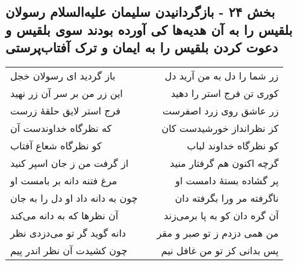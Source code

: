 \begin{center}
\section*{بخش ۲۴ - بازگردانیدن سلیمان علیه‌السلام رسولان بلقیس را به آن هدیه‌ها کی آورده بودند سوی بلقیس و دعوت  کردن بلقیس را به ایمان  و ترک آفتاب‌پرستی}
\label{sec:sh024}
\begin{longtable}{l p{0.5cm} r}
باز گردید ای رسولان خجل
&&
زر شما را دل به من آرید دل
\\
این زر من بر سر آن زر نهید
&&
کوری تن فرج استر را دهید
\\
فرج استر لایق حلقهٔ زرست
&&
زر عاشق روی زرد اصفرست
\\
که نظرگاه خداوندست آن
&&
کز نظرانداز خورشیدست کان
\\
کو نظرگاه شعاع آفتاب
&&
کو نظرگاه خداوند لباب
\\
از گرفت من ز جان اسپر کنید
&&
گرچه اکنون هم گرفتار منید
\\
مرغ فتنه دانه بر بامست او
&&
پر گشاده بستهٔ دامست او
\\
چون به دانه داد او دل را به جان
&&
ناگرفته مر ورا بگرفته دان
\\
آن نظرها که به دانه می‌کند
&&
آن گره دان کو به پا برمی‌زند
\\
دانه گوید گر تو می‌دزدی نظر
&&
من همی دزدم ز تو صبر و مقر
\\
چون کشیدت آن نظر اندر پیم
&&
پس بدانی کز تو من غافل نیم
\\
\end{longtable}
\end{center}
